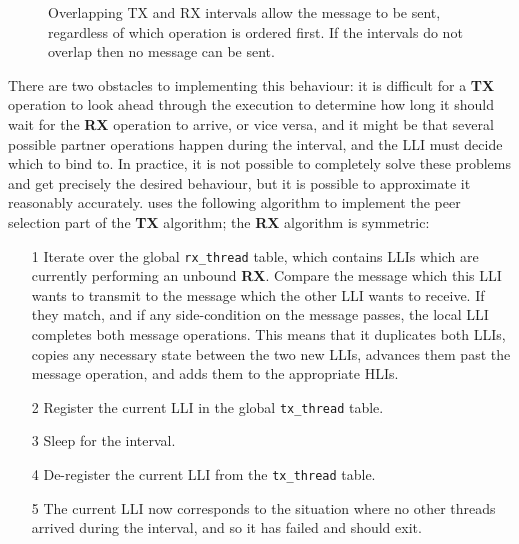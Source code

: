 \begin{figure}
{
    \hspace{4mm}
    \label{fig:enforce:message_windows:failed}
  }
  {\hfill}
  \vspace{-12pt}
  \caption{Overlapping TX and RX intervals allow the message to be
    sent, regardless of which operation is ordered first.  If the
    intervals do not overlap then no message can be sent.}
  \label{fig:enforce:message_windows}
\end{figure}

There are two obstacles to implementing this behaviour: it is
difficult for a \textbf{TX} operation to look ahead through the
execution to determine how long it should wait for the \textbf{RX}
operation to arrive, or vice versa, and it might be that several
possible partner operations happen during the interval, and the LLI
must decide which to bind to.  In practice, it is not possible to
completely solve these problems and get precisely the desired
behaviour, but it is possible to approximate it reasonably accurately.
{\Implementation} uses the following algorithm to implement the peer
selection part of the \textbf{TX} algorithm; the \textbf{RX} algorithm
is symmetric:

\begin{itemize}
\item[1] Iterate over the global \texttt{rx\_thread} table, which
  contains LLIs which are currently performing an unbound \textbf{RX}.
  Compare the message which this LLI wants to transmit to the message
  which the other LLI wants to receive.  If they match, and if any
  side-condition on the message passes, the local LLI completes both
  message operations.  This means that it duplicates both LLIs, copies
  any necessary state between the two new LLIs, advances them past the
  message operation, and adds them to the appropriate HLIs.
\item[2] Register the current LLI in the global \texttt{tx\_thread}
  table.
\item[3] Sleep for the interval.
\item[4] De-register the current LLI from the \texttt{tx\_thread}
  table.
\item[5] The current LLI now corresponds to the situation where no
  other threads arrived during the interval, and so it has failed and
  should exit.
\end{itemize}

